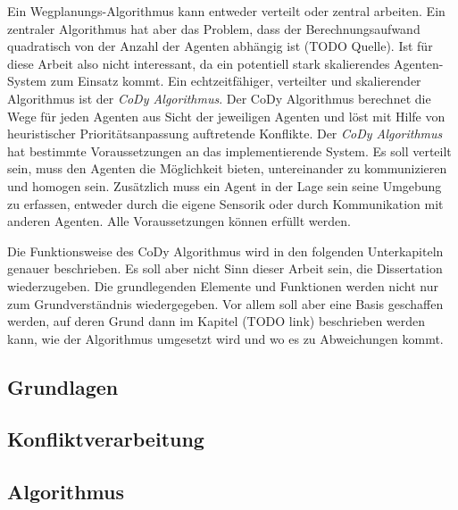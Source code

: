 Ein Wegplanungs-Algorithmus kann entweder verteilt oder zentral arbeiten. Ein zentraler Algorithmus hat aber das Problem, dass der Berechnungsaufwand quadratisch von der Anzahl der Agenten abhängig ist (TODO Quelle). Ist für diese Arbeit also nicht interessant, da ein potentiell stark skalierendes Agenten-System zum Einsatz kommt. Ein echtzeitfähiger, verteilter und skalierender Algorithmus ist der \textit{CoDy Algorithmus}. Der CoDy Algorithmus berechnet die Wege für jeden Agenten aus Sicht der jeweiligen Agenten und löst mit Hilfe von heuristischer Prioritätsanpassung auftretende Konflikte. Der \textit{CoDy Algorithmus} hat bestimmte Voraussetzungen an das implementierende System. Es soll verteilt sein, muss den Agenten die Möglichkeit bieten, untereinander zu kommunizieren und homogen sein. Zusätzlich muss ein Agent in der Lage sein seine Umgebung zu erfassen, entweder durch die eigene Sensorik oder durch Kommunikation mit anderen Agenten. Alle Voraussetzungen können erfüllt werden. \cite{book:regele}

Die Funktionsweise des CoDy Algorithmus wird in den folgenden Unterkapiteln genauer beschrieben. Es soll aber nicht Sinn dieser Arbeit sein, die Dissertation wiederzugeben. Die grundlegenden Elemente und Funktionen werden nicht nur zum Grundverständnis wiedergegeben. Vor allem soll aber eine Basis geschaffen werden, auf deren Grund dann im Kapitel (TODO link) beschrieben werden kann, wie der Algorithmus umgesetzt wird und wo es zu Abweichungen kommt.
\subsection{Grundlagen}
\label{chap:grundlagen}

%
\subsection{Konfliktverarbeitung}
\label{chap:konfliktverarbeitung}

%
\subsection{Algorithmus}
\label{chap:algorithmus}
